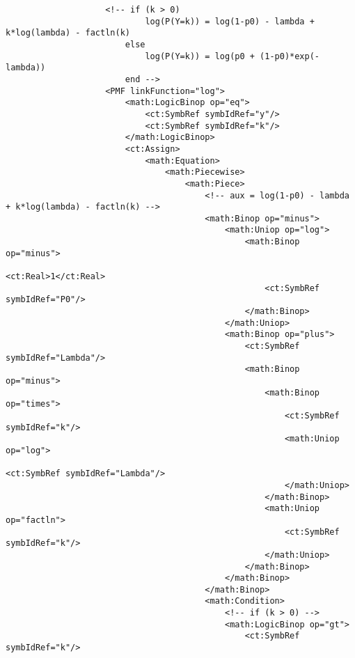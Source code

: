 \begin{lstlisting}
                    <!-- if (k > 0)
                            log(P(Y=k)) = log(1-p0) - lambda + k*log(lambda) - factln(k)
                        else
                            log(P(Y=k)) = log(p0 + (1-p0)*exp(-lambda))
                        end -->
                    <PMF linkFunction="log">
                        <math:LogicBinop op="eq">
                            <ct:SymbRef symbIdRef="y"/>
                            <ct:SymbRef symbIdRef="k"/>
                        </math:LogicBinop>
                        <ct:Assign>
                            <math:Equation>
                                <math:Piecewise>
                                    <math:Piece>
                                        <!-- aux = log(1-p0) - lambda + k*log(lambda) - factln(k) -->
                                        <math:Binop op="minus">
                                            <math:Uniop op="log">
                                                <math:Binop op="minus">
                                                    <ct:Real>1</ct:Real>
                                                    <ct:SymbRef symbIdRef="P0"/>
                                                </math:Binop>
                                            </math:Uniop>
                                            <math:Binop op="plus">
                                                <ct:SymbRef symbIdRef="Lambda"/>
                                                <math:Binop op="minus">
                                                    <math:Binop op="times">
                                                        <ct:SymbRef symbIdRef="k"/>
                                                        <math:Uniop op="log">
                                                            <ct:SymbRef symbIdRef="Lambda"/>
                                                        </math:Uniop>
                                                    </math:Binop>
                                                    <math:Uniop op="factln">
                                                        <ct:SymbRef symbIdRef="k"/>
                                                    </math:Uniop>
                                                </math:Binop>
                                            </math:Binop>
                                        </math:Binop>
                                        <math:Condition>
                                            <!-- if (k > 0) -->
                                            <math:LogicBinop op="gt">
                                                <ct:SymbRef symbIdRef="k"/>

\end{lstlisting}
